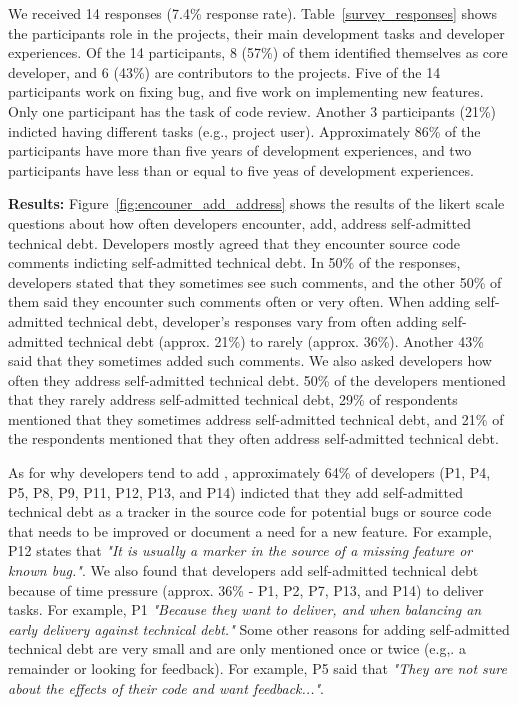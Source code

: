 We received 14 responses (7.4\% response rate). Table~\ref{survey_responses} shows the participants role in the projects, their main development tasks and developer experiences. Of the 14 participants, 8 (57\%) of them identified themselves as core developer, and 6 (43\%) are contributors to the projects. Five of the 14 participants work on fixing bug, and five work on implementing new features. Only one participant has the task of code review. Another 3 participants (21\%) indicted having different tasks (e.g., project user). Approximately 86\% of the participants have more than five years of development experiences, and two participants have less than or equal to five yeas of development experiences.



\noindent \textbf{Results:} 
Figure~\ref{fig:encouner_add_address} shows the results of the likert scale questions about how often developers encounter, add, address self-admitted technical debt. Developers mostly agreed that they encounter source code comments indicting self-admitted technical debt. In 50\% of the responses, developers stated that they sometimes see such comments, and the other 50\% of them said they encounter such comments often or very often. When adding self-admitted technical debt, developer's responses vary from often adding self-admitted technical debt (approx. 21\%) to rarely (approx. 36\%). Another 43\% said that they sometimes added such comments. We also asked developers how often they address self-admitted technical debt. 50\% of the developers mentioned that they rarely address self-admitted technical debt, 29\% of respondents mentioned that they sometimes address self-admitted technical debt, and 21\% of the respondents mentioned that they often address self-admitted technical debt.

As for why developers tend to add \SATD, approximately 64\% of developers (P1, P4, P5, P8, P9, P11, P12, P13, and P14) indicted that they add self-admitted technical debt as a tracker in the source code for potential bugs or source code that needs to be improved or document a need for a new feature. For example, P12 states that \textit{"It is usually a marker in the source of a missing feature or known bug."}. We also found that developers add self-admitted technical debt because of time pressure (approx. 36\% - P1, P2, P7, P13, and P14) to deliver tasks. For example, P1 \textit{"Because they want to deliver, and when balancing an early delivery against technical debt."} Some other reasons for adding self-admitted technical debt are very small and are only mentioned once or twice (e.g,. a remainder or looking for feedback). For example, P5 said that \textit{"They are not sure about the effects of their code and want feedback..."}.

